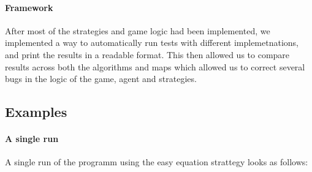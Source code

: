 \documentclass[british]{article}
\begin{document}
\paragraph{Framework} After most of the strategies and game logic had been implemented, we implemented a way to automatically run tests with different implemetnations, and print the results in a readable format. This then allowed us to compare results across both the algorithms and maps which allowed us to correct several bugs in the logic of the game, agent and strategies. 
\subsection{Examples}
\label{example}
\paragraph{A single run} A single run of the programm using the easy equation strattegy looks as follows:
\end{document}
